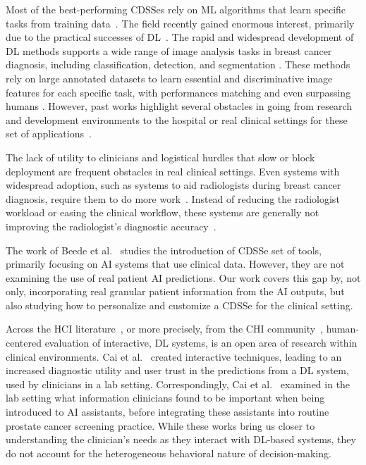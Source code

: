 Most of the best-performing \acp{CDSSe} rely on \ac{ML} algorithms that learn specific tasks from training data~\cite{10.1001/jama.2018.17163, 10.1145/3399715.3399744}.
The field recently gained enormous interest, primarily due to the practical successes of \ac{DL}~\cite{10.1007/978-3-030-22871-2_67}.
The rapid and widespread development of \ac{DL} methods supports a wide range of image analysis tasks in breast cancer diagnosis, including classification, detection, and segmentation \cite{lecun2015deep, DIN2022106073}.
These methods rely on large annotated datasets to learn essential and discriminative image features for each specific task, with performances matching and even surpassing humans \cite{esteva2017dermatologist}.
However, past works highlight several obstacles in going from research and development environments to the hospital or real clinical settings for these set of applications~\cite{https://doi.org/10.3322/caac.21552, 10.1145/3313831.3376718}.

The lack of utility to clinicians and logistical hurdles that slow or block deployment are frequent obstacles in real clinical settings.
Even systems with widespread adoption, such as systems to aid radiologists during breast cancer diagnosis, require them to do more work~\cite{KOHLI2018535}.
Instead of reducing the radiologist workload or easing the clinical workflow, these systems are generally not improving the radiologist's diagnostic accuracy~\cite{KOHLI2018535}.

The work of Beede et al.~\cite{10.1145/3313831.3376718} studies the introduction of \ac{CDSSe} set of tools, primarily focusing on \ac{AI} systems that use clinical data.
However, they are not examining the use of real patient \ac{AI} predictions.
Our work covers this gap by, not only, incorporating real granular patient information from the \ac{AI} outputs, but also studying how to personalize and customize a \ac{CDSSe} for the clinical setting.

Across the \ac{HCI} literature~\cite{10.1145/3311957.3359433, 10.1145/3359206, 10.1145/3538882.3542790}, or more precisely, from the \acs{CHI} community~\cite{10.1145/3313831.3376718, 10.1145/3290605.3300234}, human-centered evaluation of interactive, \ac{DL} systems, is an open area of research within clinical environments.
Cai et al.~\cite{10.1145/3290605.3300234} created interactive techniques, leading to an increased diagnostic utility and user trust in the predictions from a \ac{DL} system, used by clinicians in a lab setting.
Correspondingly, Cai et al.~\cite{10.1145/3359206} examined in the lab setting what information clinicians found to be important when being introduced to \ac{AI} assistants, before integrating these assistants into routine prostate cancer screening practice.
While these works bring us closer to understanding the clinician's needs as they interact with \ac{DL}-based systems, they do not account for the heterogeneous behavioral nature of decision-making.

